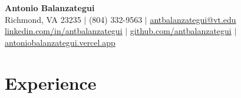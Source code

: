 \documentclass[letterpaper,9pt]{extarticle}
\begin{document}
\begin{center}
  {\LARGE\bfseries Antonio Balanzategui}\\[0.6ex]
  Richmond, VA 23235 $\vert$ (804) 332-9563 $\vert$ \href{mailto:antbalanzategui@vt.edu}{antbalanzategui@vt.edu}\\[0.3ex]
  \href{https://linkedin.com/in/antbalanzategui}{linkedin.com/in/antbalanzategui} $\vert$
  \href{https://github.com/antbalanzategui}{github.com/antbalanzategui} $\vert$
  \href{https://antoniobalanzategui.vercel.app}{antoniobalanzategui.vercel.app}
\end{center}

\section{Experience}
\end{document}
